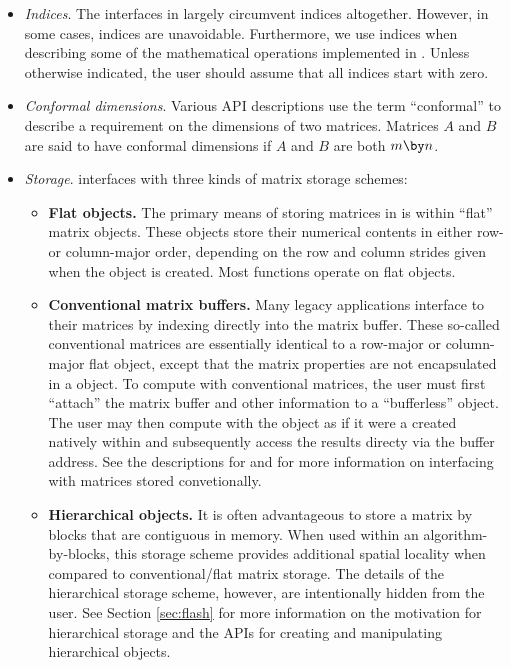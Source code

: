 \begin{itemize}
\item
{\em Indices}.
The interfaces in \libflame largely circumvent indices altogether.
However, in some cases, indices are unavoidable.
Furthermore, we use indices when describing some of the mathematical
operations implemented in \libflamens.
Unless otherwise indicated, the user should assume that all indices
start with zero.

\item
{\em Conformal dimensions}.
Various API descriptions use the term ``conformal'' to describe a requirement
on the dimensions of two matrices.
Matrices $ A $ and $ B $ are said to have conformal dimensions if
$ A $ and $ B $ are both $ m \by n $.

\item
{\em Storage}.
\libflame interfaces with three kinds of matrix storage schemes:
\begin{itemize}
\item {\bf Flat objects.} The primary means of storing matrices in
\libflame is within ``flat'' matrix objects.
These objects store their numerical contents in either row- or column-major
order, depending on the row and column strides given when the object is
created.
Most \libflame functions operate on flat objects.
\item {\bf Conventional matrix buffers.} Many legacy applications interface
to their matrices by indexing directly into the matrix buffer.
These so-called conventional matrices are essentially identical to a
row-major or column-major flat object, except that the matrix properties are
not encapsulated in a \libflame object.
To compute with conventional matrices, the user must first ``attach'' the
matrix buffer and other information to a ``bufferless'' object.
The user may then compute with the object as if it were a created natively
within \libflame and subsequently access the results directy via the buffer
address.
See the descriptions for \flaobjcreatewithoutbuffer and \flaobjattachbuffer
for more information on interfacing with matrices stored convetionally.
\item {\bf Hierarchical objects.} It is often advantageous to store a matrix
by blocks that are contiguous in memory.
When used within an algorithm-by-blocks, this storage scheme provides additional
spatial locality when compared to conventional/flat matrix storage.
The details of the hierarchical storage scheme, however, are intentionally
hidden from the user.
See Section \ref{sec:flash} for more information on the motivation for
hierarchical storage and the \libflame APIs for creating and manipulating
hierarchical objects.
\end{itemize}


\end{itemize}
